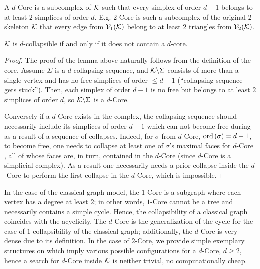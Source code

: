 \begin{definition}[\(d\)-Core]
      A \(d\)-Core is a subcomplex of \( \mathcal{K} \) such that every simplex of order \( d - 1\) belongs to at least \( 2 \) simplices of order \( d \). E.g. \(2\)-Core is such a subcomplex of the original 2-skeleton \( \mathcal{K} \) that every edge from \( \mathcal{V}_{1}(\mathcal{K}) \) belong to at least \(2\) triangles from \( \mathcal{V}_{2}(\mathcal{K}) \).
\end{definition}

\begin{lemma}
      \( \mathcal{K} \) is \(d\)-collapsible if and only if it does not contain a \( d\)-core.
\end{lemma}
\begin{proof}
      The proof of the lemma above naturally follows from the definition of the core. Assume \( \Sigma \) is a \(d\)-collapsing sequence, and \( \mathcal{K} \backslash \Sigma \) consists of more than a single vertex and has no free simplices of order \( \le d-1\) (``collapsing sequence gets stuck''). Then, each simplex of order \( d-1 \) is no free but belongs to at least \(2\) simplices of order \(d\), so \( \mathcal{K} \backslash \Sigma \) is a \( d \)-Core. 
      
      Conversely if a \(d\)-Core exists in the complex, the collapsing sequence should necessarily include its simplices of order \( d - 1 \) which can not become free during as a result of a sequence of collapses. Indeed, for \(\sigma\) from \(d\)-Core,  \(\mathrm{ord}\,(\sigma) = d-1\), to become free, one needs to collapse at least one of \(\sigma\)'s maximal faces for \( d\)-Core , all of whose faces are, in turn, contained in the \( d\)-Core (since \(d\)-Core is a simplicial complex). As a result one necessarily needs a prior collapse inside the \(d\)-Core to perform the first collapse in the \(d\)-Core, which is impossible.
\end{proof}

In the case of the classical graph model, the \( 1 \)-Core is a subgraph where each vertex has a degree at least \( 2 \); in other words, \( 1 \)-Core cannot be a tree and necessarily contains a simple cycle. Hence, the collapsibility of a classical graph coincides with the acyclicity. The \(d\)-Core is the generalization of the cycle for the case of \(1\)-collapsibility of the classical graph; additionally, the \(d\)-Core is very dense due to its definition. In the case of \(2\)-Core, we provide simple exemplary structures on  which imply various possible configurations for a  \(d\)-Core, \( d \ge 2 \), hence a search for \(d\)-Core inside \( \mathcal{K} \) is neither trivial, no computationally cheap.

